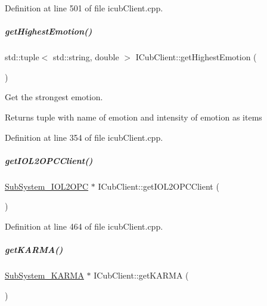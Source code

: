 Definition at line 501 of file icub\+Client.\+cpp.

\mbox{\label{group__icubclient__clients_a121c1d28c4b6f8c8cec80f4216dfb30c}} 
\subparagraph{\texorpdfstring{get\+Highest\+Emotion()}{getHighestEmotion()}}
{\footnotesize\ttfamily std\+::tuple$<$ std\+::string, double $>$ I\+Cub\+Client\+::get\+Highest\+Emotion (\begin{DoxyParamCaption}{ }\end{DoxyParamCaption})}



Get the strongest emotion. 

\begin{DoxyReturn}{Returns}
tuple with name of emotion and intensity of emotion as items 
\end{DoxyReturn}


Definition at line 354 of file icub\+Client.\+cpp.

\mbox{\label{group__icubclient__clients_ae5b9052e8435d13811e30f3d74343536}} 
\subparagraph{\texorpdfstring{get\+I\+O\+L2\+O\+P\+C\+Client()}{getIOL2OPCClient()}}
{\footnotesize\ttfamily \hyperlink{group__icubclient__subsystems_classicubclient_1_1SubSystem__IOL2OPC}{Sub\+System\+\_\+\+I\+O\+L2\+O\+PC} $\ast$ I\+Cub\+Client\+::get\+I\+O\+L2\+O\+P\+C\+Client (\begin{DoxyParamCaption}{ }\end{DoxyParamCaption})}



Definition at line 464 of file icub\+Client.\+cpp.

\mbox{\label{group__icubclient__clients_a95285ba946061fa56e031f72b70110ed}} 
\subparagraph{\texorpdfstring{get\+K\+A\+R\+M\+A()}{getKARMA()}}
{\footnotesize\ttfamily \hyperlink{group__icubclient__subsystems_classicubclient_1_1SubSystem__KARMA}{Sub\+System\+\_\+\+K\+A\+R\+MA} $\ast$ I\+Cub\+Client\+::get\+K\+A\+R\+MA (\begin{DoxyParamCaption}{ }\end{DoxyParamCaption})}



